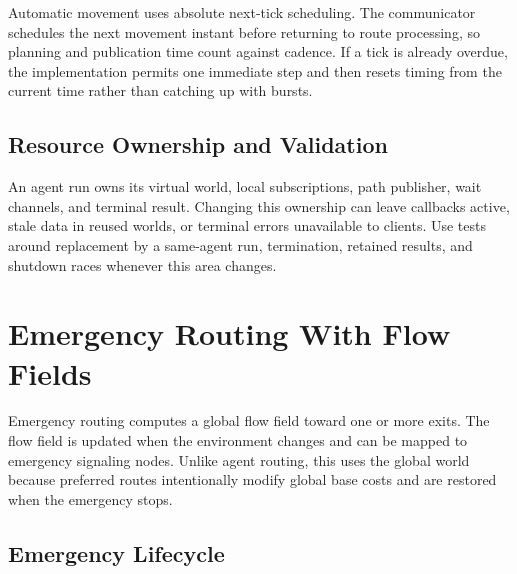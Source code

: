 \documentclass[12pt,a4paper]{report}
\begin{document}
Automatic movement uses absolute next-tick scheduling. The communicator schedules
the next movement instant before returning to route processing, so planning and
publication time count against cadence. If a tick is already overdue, the
implementation permits one immediate step and then resets timing from the current
time rather than catching up with bursts.

\subsection{Resource Ownership and Validation}

An agent run owns its virtual world, local subscriptions, path publisher, wait
channels, and terminal result. Changing this ownership can leave callbacks
active, stale data in reused worlds, or terminal errors unavailable to clients.
Use tests around replacement by a same-agent run, termination, retained results,
and shutdown races whenever this area changes.

\section{Emergency Routing With Flow Fields}

Emergency routing computes a global flow field toward one or more exits. The
flow field is updated when the environment changes and can be mapped to
emergency signaling nodes. Unlike agent routing, this uses the global world
because preferred routes intentionally modify global base costs and are restored
when the emergency stops.

\subsection{Emergency Lifecycle}
\end{document}

